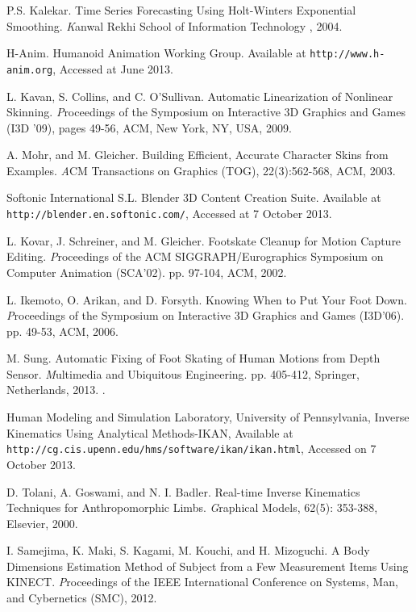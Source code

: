 \documentclass[number,preprint,review,12pt]{elsarticle}
\begin{document}
\begin{thebibliography}{}
P.S. Kalekar. Time Series Forecasting Using Holt-Winters Exponential Smoothing. {\textit Kanwal Rekhi School of Information Technology}
, 2004.

H-Anim. Humanoid Animation Working Group. Available at \verb+http://www.h-anim.org+, Accessed at June 2013.

L. Kavan, S. Collins, and C. O'Sullivan. Automatic Linearization of Nonlinear Skinning. {\textit Proceedings of the Symposium on Interactive 3D Graphics and Games (I3D '09)}, pages 49-56, ACM, New York, NY, USA, 2009.

A. Mohr, and M. Gleicher. Building Efficient, Accurate Character Skins from Examples. {\textit ACM Transactions on Graphics (TOG)}, 22(3):562-568, ACM, 2003.

Softonic International S.L. 
Blender 3D Content Creation Suite. Available at \verb+http://blender.en.softonic.com/+, Accessed at 7 October 2013.

L. Kovar, J. Schreiner, and M. Gleicher. Footskate Cleanup for Motion Capture Editing. {\textit Proceedings of the ACM SIGGRAPH/Eurographics Symposium on Computer Animation (SCA'02)}. pp. 97-104, ACM, 2002.

L. Ikemoto, O. Arikan, and D. Forsyth. Knowing When to Put Your Foot Down. {\textit Proceedings of the Symposium on Interactive 3D Graphics and Games (I3D'06)}. pp. 49-53, ACM, 2006.

M. Sung. Automatic Fixing of Foot Skating of Human Motions from Depth Sensor. {\textit Multimedia and Ubiquitous Engineering}. pp. 405-412, Springer, Netherlands, 2013. .

Human Modeling and Simulation Laboratory, University of Pennsylvania, Inverse Kinematics Using Analytical Methods-IKAN, Available at \verb+http://cg.cis.upenn.edu/hms/software/ikan/ikan.html+, Accessed on 7 October 2013.

D. Tolani,  A. Goswami, and N. I. Badler. Real-time Inverse Kinematics Techniques for Anthropomorphic Limbs. {\textit Graphical Models}, 62(5): 353-388, Elsevier, 2000.

I. Samejima, K. Maki, S. Kagami, M. Kouchi, and H. Mizoguchi. A Body Dimensions Estimation Method of Subject from a Few Measurement Items Using KINECT. {\textit Proceedings of the IEEE International Conference on Systems, Man, and Cybernetics (SMC)}, 2012.

\end{thebibliography}
\end{document}
